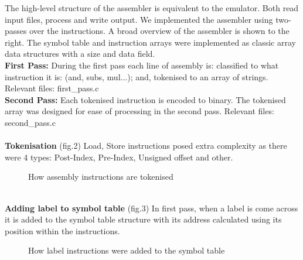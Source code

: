 \documentclass[11pt]{article}
\begin{document}
The high-level structure of the assembler is equivalent to the emulator. Both read input files, process and write output. We implemented the assembler using two-passes over the instructions. A broad overview of the assembler is shown to the right. The symbol table and instruction arrays were implemented as classic array data structures with a size and data field.\\
\textbf{First Pass:} During the first pass each line of assembly is: classified to what instruction it is: (and, subs, mul...); and, tokenised to an array of strings. Relevant files: first\_pass.c\\
\textbf{Second Pass:} Each tokenised instruction is encoded to binary. The tokenised array was designed for ease of processing in the second pass. Relevant files: second\_pass.c\\
\\
\textbf{Tokenisation} (fig.2) Load, Store instructions posed extra complexity as there were 4 types: Post-Index, Pre-Index, Unsigned offset and other.\\
\begin{figure}[h]
    \centering
    \caption{How assembly instructions are tokenised}
    \label{fig:scp-flowchart}
\end{figure}\\
\textbf{Adding label to symbol table} (fig.3) In first pass, when a label is come across it is added to the symbol table structure with its address calculated using its position within the instructions.
\begin{figure}[t]
    \centering
    \caption{How label instructions were added to the symbol table}
    \label{fig:scp-flowchart}
\end{figure}
\\
\end{document}
